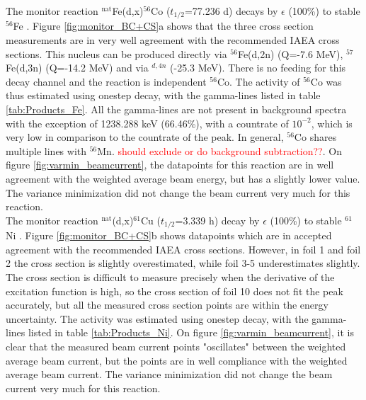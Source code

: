 \noindent
The monitor reaction  $^\text{nat}$Fe(d,x)$^{56}$Co ($t_{1/2}$=77.236 d) decays by $\epsilon$ (100\%) to stable $^{56}$Fe \cite{Junde2011}. Figure \ref{fig:monitor_BC+CS}a shows that the three cross section measurements are in very well agreement with the recommended IAEA cross sections. This nucleus can be produced directly via $^{56}$Fe(d,2n) (Q=-7.6 MeV), $^{57}$Fe(d,3n) (Q=-14.2 MeV) and via $^{d,4n}$ (-25.3 MeV). There is no feeding for this decay channel and the reaction is independent $^{56}$Co. The activity of $^{56}$Co was thus estimated using onestep decay, with the gamma-lines listed in table \ref{tab:Products_Fe}. All the gamma-lines are not present in background spectra with the exception of 1238.288 keV (66.46\%), with a countrate of $10^{-2}$, which is very low in comparison to the countrate of the peak. In general, $^{56}$Co shares multiple lines with $^{56}$Mn. \textcolor{red}{should exclude or do background subtraction??}. On figure \ref{fig:varmin_beamcurrent}, the datapoints for this reaction are in well agreement with the weighted average beam energy, but has a slightly lower value. The variance minimization did not change the beam current very much for this reaction. \\

\noindent 
The monitor reaction $^\text{nat}$(d,x)$^{61}$Cu ($t_{1/2}$=3.339 h) decay by $\epsilon$ (100\%) to stable $^{61}$Ni \cite{Zuber2015}. Figure \ref{fig:monitor_BC+CS}b shows datapoints which are in accepted agreement with the recommended IAEA cross sections. However, in foil 1 and foil 2 the cross section is slightly overestimated, while foil 3-5 underestimates slightly. The cross section is difficult to measure precisely when the derivative of the excitation function is high, so the cross section of foil 10 does not fit the peak accurately, but all the measured cross section points are within the energy uncertainty. The activity was estimated using onestep decay, with the gamma-lines listed in table \ref{tab:Products_Ni}. On figure \ref{fig:varmin_beamcurrent}, it is clear that the measured beam current points "oscillates" between the weighted average beam current, but the points are in well compliance with the weighted average beam current. The variance minimization did not change the beam current very much for this reaction. \\

